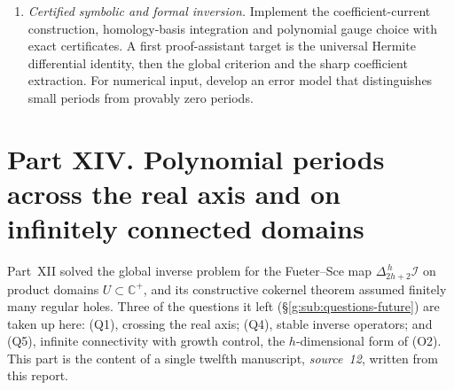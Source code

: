 \documentclass[11pt,a4paper]{article}
\numberwithin{equation}{section}
\theoremstyle{definition}
\theoremstyle{remark}
\theoremstyle{plain}
\newcommand{\CC}{\mathbb C}
\newcommand{\Cplus}{\CC^{+}}
\newcommand{\I}{\mathcal I}
\newcommand{\lapH}{\Delta_{2h+2}^{\,h}}
\begin{document}
\begin{enumerate}[label=\textup{(Q\arabic*)}]
$L^\alpha$ residue classification for $\alpha\ge1$ is settled
(Corollary~\ref{g:cor:Lalpha}). Determine optimal weak-$L^\alpha$, Lorentz and
weighted analogues, and additional hypotheses that turn zero residue into
removability, separating conditions on the target from conditions on a
selected inverse, since a zero-residue target can still have arbitrarily
severe singularities. Compare~(O5).
\item \emph{Certified symbolic and formal inversion.} Implement the
coefficient-current construction, homology-basis integration and polynomial
gauge choice with exact certificates. A first proof-assistant target is the
universal Hermite differential identity, then the global criterion and the
sharp coefficient extraction. For numerical input, develop an error model
that distinguishes small periods from provably zero periods.
\end{enumerate}



\section[Part XIV. Polynomial periods across the axis and at infinite
connectivity]{Part XIV. Polynomial periods across the real axis and on
infinitely connected domains}
\label{h:sec:part}

Part~XII solved the global inverse problem for the Fueter--Sce map $\lapH\I$
on product domains $U\subset\Cplus$, and its constructive cokernel theorem
assumed finitely many regular holes. Three of the questions it left
(\S\ref{g:sub:questions-future}) are taken up here: (Q1), crossing the real
axis; (Q4), stable inverse operators; and (Q5), infinite connectivity with
growth control, the $h$-dimensional form of (O2). This part is the content of
a single twelfth manuscript, \emph{source~12}, written from this report.
\end{document}
